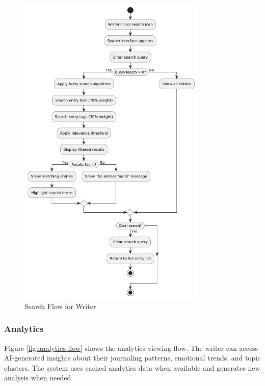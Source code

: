 \begin{figure}[H]
\centering
\includegraphics[width=0.8\textwidth]{files/imgs/search_flow.png}
\caption{Search Flow for Writer}
\label{fig:search-flow}
\end{figure}

\subsubsection{Analytics}\label{subsubsec:analytics}

Figure \ref{fig:analytics-flow} shows the analytics viewing flow. The writer can access AI-generated insights about their journaling patterns, emotional trends, and topic clusters. The system uses cached analytics data when available and generates new analysis when needed.

